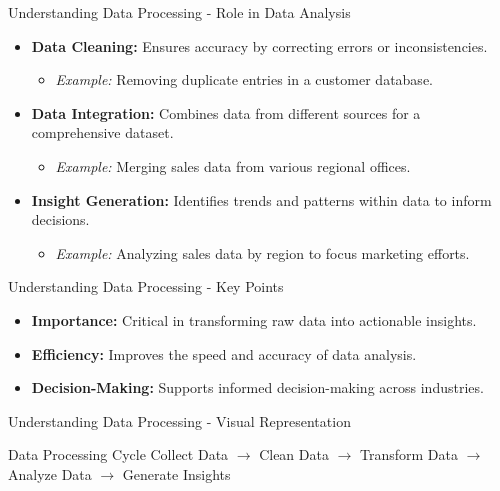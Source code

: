 \documentclass[aspectratio=169]{beamer}
\begin{document}
\begin{frame}[fragile]{Understanding Data Processing - Role in Data Analysis}
    \begin{itemize}
        \item \textbf{Data Cleaning:} Ensures accuracy by correcting errors or inconsistencies.
        \begin{itemize}
            \item \textit{Example:} Removing duplicate entries in a customer database.
        \end{itemize}
        \item \textbf{Data Integration:} Combines data from different sources for a comprehensive dataset.
        \begin{itemize}
            \item \textit{Example:} Merging sales data from various regional offices.
        \end{itemize}
        \item \textbf{Insight Generation:} Identifies trends and patterns within data to inform decisions.
        \begin{itemize}
            \item \textit{Example:} Analyzing sales data by region to focus marketing efforts.
        \end{itemize}
    \end{itemize}
\end{frame}

\begin{frame}[fragile]{Understanding Data Processing - Key Points}
    \begin{itemize}
        \item \textbf{Importance:} Critical in transforming raw data into actionable insights.
        \item \textbf{Efficiency:} Improves the speed and accuracy of data analysis.
        \item \textbf{Decision-Making:} Supports informed decision-making across industries.
    \end{itemize}
\end{frame}

\begin{frame}[fragile]{Understanding Data Processing - Visual Representation}
    \begin{block}{Data Processing Cycle}
        Collect Data $\rightarrow$ Clean Data $\rightarrow$ Transform Data $\rightarrow$ Analyze Data $\rightarrow$ Generate Insights
    \end{block}
\end{frame}
\end{document}
